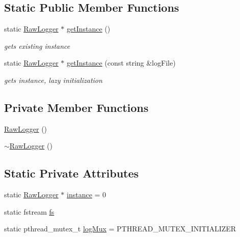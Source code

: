 \subsection*{Static Public Member Functions}
\begin{DoxyCompactItemize}
\item 
static \hyperlink{classit_1_1testbench_1_1logger_1_1RawLogger}{Raw\-Logger} $\ast$ \hyperlink{classit_1_1testbench_1_1logger_1_1RawLogger_a3eec9bfdaff55f4e9896aa2723806163}{get\-Instance} ()
\begin{DoxyCompactList}\small\item\em gets existing instance \end{DoxyCompactList}\item 
static \hyperlink{classit_1_1testbench_1_1logger_1_1RawLogger}{Raw\-Logger} $\ast$ \hyperlink{classit_1_1testbench_1_1logger_1_1RawLogger_a2018dd12f5dce3b6e4e00c0b4ac872cc}{get\-Instance} (const string \&log\-File)
\begin{DoxyCompactList}\small\item\em gets instance, lazy initialization \end{DoxyCompactList}\end{DoxyCompactItemize}
\subsection*{Private Member Functions}
\begin{DoxyCompactItemize}
\item 
\hyperlink{classit_1_1testbench_1_1logger_1_1RawLogger_add8718040808a0847ca0207835cb58ea}{Raw\-Logger} ()
\item 
\hyperlink{classit_1_1testbench_1_1logger_1_1RawLogger_aa1bff2006675822badcc6b0a4f997d0b}{$\sim$\-Raw\-Logger} ()
\end{DoxyCompactItemize}
\subsection*{Static Private Attributes}
\begin{DoxyCompactItemize}
\item 
static \hyperlink{classit_1_1testbench_1_1logger_1_1RawLogger}{Raw\-Logger} $\ast$ \hyperlink{classit_1_1testbench_1_1logger_1_1RawLogger_a5462a0dfa474c6b8ecf535188f92506c}{instance} = 0
\item 
static fstream \hyperlink{classit_1_1testbench_1_1logger_1_1RawLogger_a8018918b9883568201a3107306a290dd}{fs}
\item 
static pthread\-\_\-mutex\-\_\-t \hyperlink{classit_1_1testbench_1_1logger_1_1RawLogger_acd2938fa7aeb52919e2620caa83a8880}{log\-Mux} = P\-T\-H\-R\-E\-A\-D\-\_\-\-M\-U\-T\-E\-X\-\_\-\-I\-N\-I\-T\-I\-A\-L\-I\-Z\-E\-R
\end{DoxyCompactItemize}


